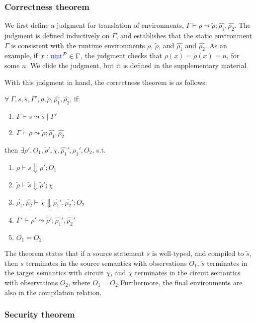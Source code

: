 \subsubsection*{Correctness theorem} We first define a judgment for
translation of environments, $\Gamma \vdash \rho \leadsto
\widetilde{\rho}; \widehat{\rho_{1}}, \widehat{\rho_{2}}$. The
judgment is defined inductively on $\Gamma$, and establishes that
the static environment $\Gamma$ is consistent with the runtime
environments $\rho$, $\widetilde{\rho}$, and $\widehat{\rho_{1}}$ and
$\widehat{\rho_{2}}$. As an example, if $x:\kw{uint}^{\mathcal{P}} \in
\Gamma$, the judgment checks that $\rho(x) = \widetilde{\rho}(x) =
n$, for some $n$. We elide the judgment, but it is defined in the
supplementary material.

With this judgment in hand, the correctness theorem is as follows:

\begin{theorem}[Correctness]
  $\forall\:\Gamma, s, \widetilde{s}, \Gamma', \rho, \widetilde{\rho}, \widehat{\rho_{1}}, \widehat{\rho_{2}}$, if:

  \begin{enumerate}
  \item $\Gamma \vdash s \leadsto \widehat{s} \mid \Gamma'$
  \item $\Gamma \vdash \rho \leadsto \widetilde{\rho}; \widehat{\rho_{1}}, \widehat{\rho_{2}}$
  \end{enumerate}

  then $\exists \rho', O_{1}, \widetilde{\rho}', \chi, \widehat{\rho_{1}}', \widehat{\rho_{1}}', O_{2}$, s.t.

  \begin{enumerate}
  \item $\rho \vdash s \Downarrow \rho'; O_{1}$
  \item $\widetilde{\rho} \vdash \widetilde{s} \Downarrow \widetilde{\rho}'; \chi$
  \item $\widehat{\rho_{1}}, \widehat{\rho_{2}} \vdash \chi \Downarrow \widehat{\rho_{1}}', \widehat{\rho_{2}}'; O_{2}$
  \item $\Gamma' \vdash \rho' \leadsto \widetilde{\rho}'; \widehat{\rho_{1}}', \widehat{\rho_{2}}'$
  \item $O_{1} = O_{2}$
  \end{enumerate}
  
\end{theorem}

The theorem states that if a source statement $s$ is well-typed, and
compiled to $\widetilde{s}$, then $s$ terminates in the source
semantics with observations $O_{1}$, $\widetilde{s}$ terminates in the
target semantics with circuit $\chi$, and $\chi$ terminates in the
circuit semantics with observations $O_{2}$, where $O_{1} = O_{2}$
Furthermore, the final environments are also in the compilation
relation.

\subsubsection*{Security theorem}

